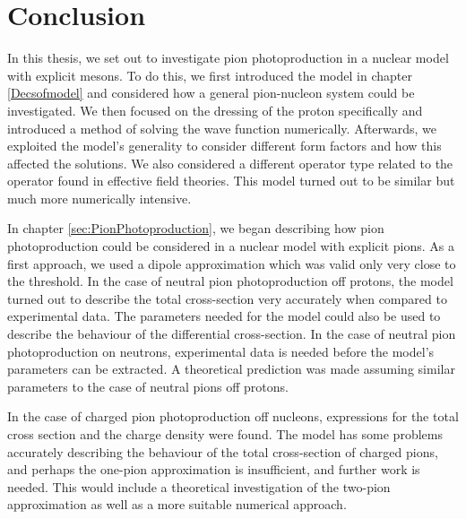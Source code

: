 \chapter{Conclusion}
In this thesis, we set out to investigate pion photoproduction in a nuclear model with explicit mesons. To do this, we first introduced the model in chapter \ref{Decsofmodel} and considered how a general pion-nucleon system could be investigated. We then focused on the dressing of the proton specifically and introduced a method of solving the wave function numerically. Afterwards, we exploited the model's generality to consider different form factors and how this affected the solutions. We also considered a different operator type related to the operator found in effective field theories. This model turned out to be similar but much more numerically intensive. 

In chapter \ref{sec:PionPhotoproduction}, we began describing how pion photoproduction could be considered in a nuclear model with explicit pions. As a first approach, we used a dipole approximation which was valid only very close to the threshold. In the case of neutral pion photoproduction off protons, the model turned out to describe the total cross-section very accurately when compared to experimental data. The parameters needed for the model could also be used to describe the behaviour of the differential cross-section. In the case of neutral pion photoproduction on neutrons, experimental data is needed before the model's parameters can be extracted. A theoretical prediction was made assuming similar parameters to the case of neutral pions off protons. 

In the case of charged pion photoproduction off nucleons, expressions for the total cross section and the charge density were found. The model has some problems accurately describing the behaviour of the total cross-section of charged pions, and perhaps the one-pion approximation is insufficient, and further work is needed. This would include a theoretical investigation of the two-pion approximation as well as a more suitable numerical approach. 

